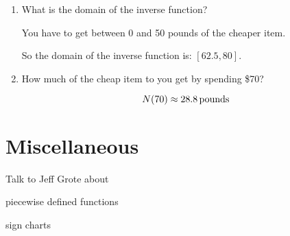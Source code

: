 \documentclass{exam}
\begin{document}
\begin{enumerate}
\begin{enumerate}[a]
      \item What is the domain of the inverse function?
        \begin{solution}
          You have to get between 0 and 50 pounds of the cheaper item.  

          So the domain of the inverse function is: $[62.5, 80]$. 
        \end{solution}

      \item How much of the cheap item to you get by spending \$70?
        \begin{solution}
          \[
            N(70) \approx \unit[28.8]{pounds}
          \]
        \end{solution}
    \end{enumerate}
\end{enumerate}

\section{Miscellaneous}

Talk to Jeff Grote about 
\begin{itemize*}
  \item piecewise defined functions
  \item sign charts
\end{itemize*}
\end{document}
